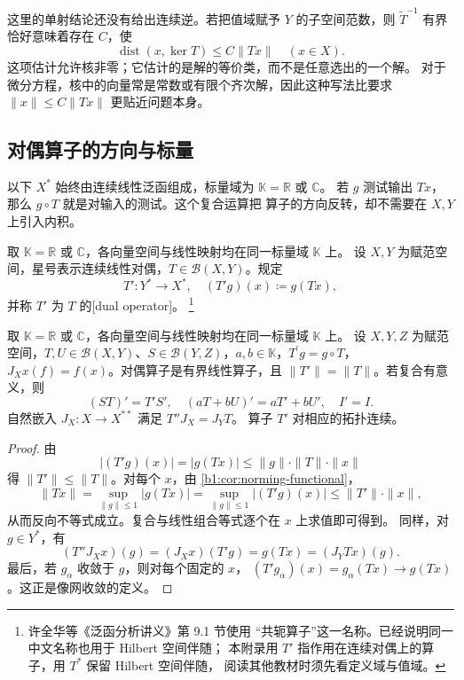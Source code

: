 这里的单射结论还没有给出连续逆。若把值域赋予 \(Y\) 的子空间范数，则
\(\widetilde T^{-1}\) 有界恰好意味着存在 \(C\)，使
\[
 \operatorname{dist}(x,\ker T)\leq C\|Tx\|\quad(x\in X).
\]
这项估计允许核非零；它估计的是解的等价类，而不是任意选出的一个解。
对于微分方程，核中的向量常是常数或有限个齐次解，因此这种写法比要求
\(\|x\|\leq C\|Tx\|\) 更贴近问题本身。

\subsection{对偶算子的方向与标量}
\label{b1:subsec:C10102}

以下 \(X^*\) 始终由连续线性泛函组成，标量域为 \(\mathbb K=\mathbb R\) 或 \(\mathbb C\)。
若 \(g\) 测试输出 \(Tx\)，那么 \(g\circ T\) 就是对输入的测试。这个复合运算把
算子的方向反转，却不需要在 \(X,Y\) 上引入内积。

\begin{definition}\label{b1:def:C1-dual-operator}
取 \(\mathbb K=\mathbb R\) 或 \(\mathbb C\)，各向量空间与线性映射均在同一标量域 \(\mathbb K\) 上。
设 \(X,Y\) 为赋范空间，星号表示连续线性对偶，\(T\in\mathcal B(X,Y)\)。规定
\[
 T':Y^*\longrightarrow X^*,\quad (T'g)(x)\coloneqq g(Tx),
\]
并称 \(T'\) 为 \(T\) 的[dual operator]。%
\footnote{许全华等《泛函分析讲义》\cite{Xu2017Fanhan}第 9.1 节使用
“共轭算子”这一名称。已经说明同一中文名称也用于 Hilbert 空间伴随；
本附录用 \(T'\) 指作用在连续对偶上的算子，用 \(T^*\) 保留 Hilbert 空间伴随，
阅读其他教材时须先看定义域与值域。}
\end{definition}

\begin{proposition}\label{b1:prop:C1-dual-calculus}
取 \(\mathbb K=\mathbb R\) 或 \(\mathbb C\)，各向量空间与线性映射均在同一标量域 \(\mathbb K\) 上。
设 \(X,Y,Z\) 为赋范空间，\(T,U\in\mathcal B(X,Y)\)、\(S\in\mathcal B(Y,Z)\)，\(a,b\in\mathbb K\)，\(T^{\prime}g=g\circ T\)，\(J_Xx(f)=f(x)\)。对偶算子是有界线性算子，且 \(\|T'\|=\|T\|\)。若复合有意义，则
\[
 (ST)'=T'S',\quad (aT+bU)'=aT'+bU',\quad I'=I.
\]
自然嵌入 \(J_X:X\rightarrow X^{**}\) 满足 \(T''J_X=J_YT\)。
算子 \(T'\) 对相应的\WeakStar{}拓扑连续。
\end{proposition}
\begin{proof}
由
\[
 |(T'g)(x)|=|g(Tx)|\leq\|g\|\cdot\|T\|\cdot\|x\|
\]
得 \(\|T'\|\leq\|T\|\)。对每个 \(x\)，由%
\cref{b1:cor:norming-functional}，
\[
 \|Tx\|=\sup_{\|g\|\leq1}|g(Tx)|
       =\sup_{\|g\|\leq1}|(T'g)(x)|
       \leq\|T'\|\cdot\|x\|,
\]
从而反向不等式成立。复合与线性组合等式逐个在 \(x\) 上求值即可得到。
同样，对 \(g\in Y^*\)，有
\[
 (T''J_Xx)(g)=(J_Xx)(T'g)=g(Tx)=(J_YTx)(g).
\]
最后，若 \(g_\alpha\) \WeakStar{}收敛于 \(g\)，则对每个固定的 \(x\)，
\((T'g_\alpha)(x)=g_\alpha(Tx)\rightarrow g(Tx)\)。这正是像网\WeakStar{}收敛的定义。
\end{proof}

